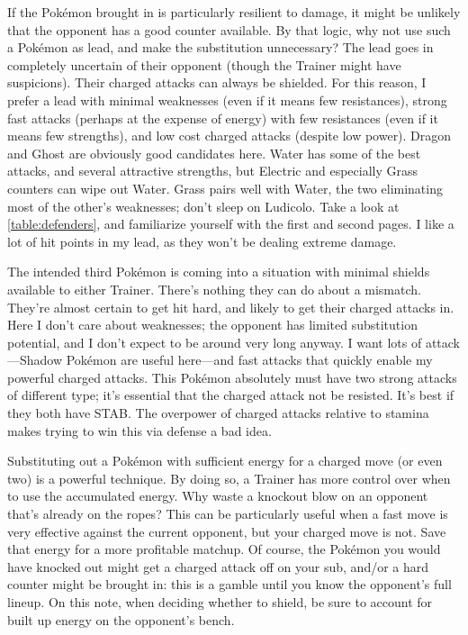 If the Pokémon brought in is particularly resilient to damage, it might be unlikely that
 the opponent has a good counter available.
By that logic, why not use such a Pokémon as lead, and make the substitution unnecessary?
The lead goes in completely uncertain of their opponent (though the Trainer might have suspicions).
Their charged attacks can always be shielded.
For this reason, I prefer a lead with minimal weaknesses (even if it means few resistances),
 strong fast attacks (perhaps at the expense of energy) with few resistances (even if it means
 few strengths), and low cost charged attacks (despite low power). 
Dragon and Ghost are obviously good candidates here.
Water has some of the best attacks, and several attractive strengths, but Electric and
 especially Grass counters can wipe out Water.
Grass pairs well with Water, the two eliminating most of the other's weaknesses;
 don't sleep on Ludicolo.
Take a look at \autoref{table:defenders}, and familiarize yourself with the first
 and second pages.
I like a lot of hit points in my lead, as they won't be dealing extreme damage.

The intended third Pokémon is coming into a situation with minimal shields available
 to either Trainer.
There's nothing they can do about a mismatch.
They're almost certain to get hit hard, and likely to get their charged attacks in.
Here I don't care about weaknesses; the opponent has limited substitution potential,
 and I don't expect to be around very long anyway.
I want lots of attack---Shadow Pokémon are useful here---and fast attacks that quickly enable my powerful charged attacks.
This Pokémon absolutely must have two strong attacks of different type; it's essential that the charged attack not be resisted.
It's best if they both have STAB\@.
The overpower of charged attacks relative to stamina makes trying to win this via defense a bad idea.

Substituting out a Pokémon with sufficient energy for a charged move (or even two) is a powerful technique.
By doing so, a Trainer has more control over when to use the accumulated energy.
Why waste a knockout blow on an opponent that's already on the ropes?
This can be particularly useful when a fast move is very effective against the current opponent,
 but your charged move is not.
Save that energy for a more profitable matchup.
Of course, the Pokémon you would have knocked out might get a charged attack off on your sub,
 and/or a hard counter might be brought in:
 this is a gamble until you know the opponent's full lineup.
On this note, when deciding whether to shield, be sure to account for built up energy on the opponent's bench.

